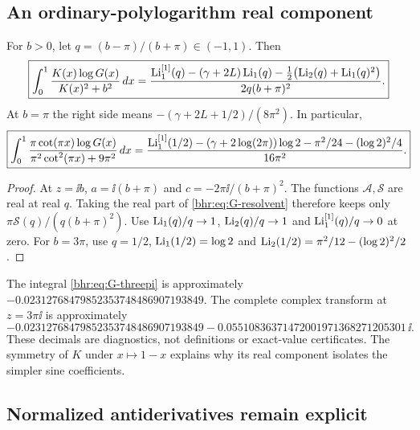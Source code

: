 \subsection{An ordinary-polylogarithm real component}

\begin{corollary}\label{bhr:cor:G-real}
For $b>0$, let $q=(b-\pi)/(b+\pi)\in(-1,1)$. Then
\begin{equation}\label{bhr:eq:G-real}
 \boxed{\displaystyle
 \int_0^1\frac{K(x)\log G(x)}{K(x)^2+b^2}\,dx
 =\frac{\operatorname{Li}_1^{[1]}(q)-(\gamma+2L)\operatorname{Li}_1(q)
       -\frac12\bigl(\operatorname{Li}_2(q)+\operatorname{Li}_1(q)^2\bigr)}
               {2q(b+\pi)^2}.}
\end{equation}
At $b=\pi$ the right side means
$-(\gamma+2L+1/2)/(8\pi^2)$. In particular,
\begin{equation}\label{bhr:eq:G-threepi}
 \boxed{\displaystyle
 \int_0^1\frac{\pi\cot(\pi x)\log G(x)}
                      {\pi^2\cot^2(\pi x)+9\pi^2}\,dx
 =\frac{\operatorname{Li}_1^{[1]}(1/2)-(\gamma+2\log(2\pi))\log2
                    -\pi^2/24-(\log2)^2/4}{16\pi^2}.}
\end{equation}
\end{corollary}
\begin{proof}
At $z=\ii b$, $a=\ii(b+\pi)$ and
$c=-2\pi\ii/(b+\pi)^2$. The functions $\mathcal A,
\mathcal S$ are real at real $q$. Taking the real part of
\eqref{bhr:eq:G-resolvent} therefore keeps only
$\pi\mathcal S(q)/(q(b+\pi)^2)$.
Use $\operatorname{Li}_1(q)/q\to1$, $\operatorname{Li}_2(q)/q\to1$ and
$\operatorname{Li}_1^{[1]}(q)/q\to0$ at zero. For $b=3\pi$, use
$q=1/2$, $\operatorname{Li}_1(1/2)=\log2$ and
$\operatorname{Li}_2(1/2)=\pi^2/12-(\log2)^2/2$.
\end{proof}

The integral \eqref{bhr:eq:G-threepi} is approximately
$-0.02312768479852353748486907193849$.
The complete complex transform at $z=3\pi\ii$ is approximately
\[
 -0.02312768479852353748486907193849
   -0.05510836371472001971368271205301\,\ii.
\]
These decimals are diagnostics, not definitions or exact-value
certificates. The symmetry of $K$ under $x\mapsto1-x$ explains
why its real component isolates the simpler sine coefficients.

\subsection{Normalized antiderivatives remain explicit}

